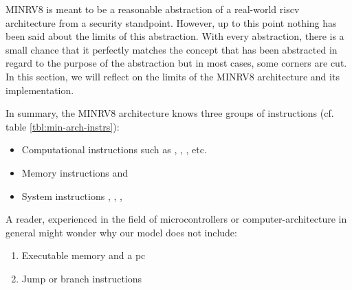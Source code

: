 MINRV8 is meant to be a reasonable abstraction of a real-world \gls{riscv} architecture from a security standpoint.
However, up to this point nothing has been said about the limits of this abstraction.
With every abstraction, there is a small chance that it perfectly matches the concept that has been abstracted in regard to the purpose of the abstraction but in most cases, some corners are cut.
In this section, we will reflect on the limits of the MINRV8 architecture and its implementation.


In summary, the MINRV8 architecture knows three groups of instructions (cf. table \ref{tbl:min-arch-instrs}):
\begin{itemize}
    \item Computational instructions such as , , , etc.
    \item Memory instructions  and 
    \item System instructions , , , 
\end{itemize}

A reader, experienced in the field of microcontrollers or computer-architecture in general might wonder why our model does not include:
\begin{enumerate}
    \item Executable memory and a \gls{pc}
    \item Jump or branch instructions
\end{enumerate}

